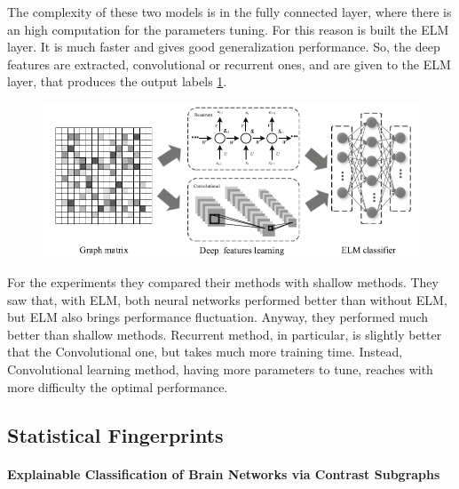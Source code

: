 The complexity of these two models is in the fully connected layer, where there is an high computation for the parameters tuning. For this reason is built the ELM layer. It is much faster and gives good generalization performance. So, the deep features are extracted, convolutional or recurrent ones, and are given to the ELM layer, that produces the output labels \ref{fig:diagram10}. 

\begin{figure}[htbp]
	\centering
	\includegraphics[scale=0.5]{Immagini/functional3.PNG}
	\caption{\label{fig:diagram10}}
\end{figure}

For the experiments they compared their methods with shallow methods. They saw that, with ELM, both neural networks performed better than without ELM, but ELM also brings performance fluctuation. Anyway, they performed much better than shallow methods. Recurrent method, in particular, is slightly better that the Convolutional one, but takes much more training time. Instead, Convolutional learning method, having more parameters to tune, reaches with more difficulty the optimal performance.

\subsection{Statistical Fingerprints}
\paragraph{Explainable Classification of Brain Networks via Contrast Subgraphs}\
\\
\label{par:1}

